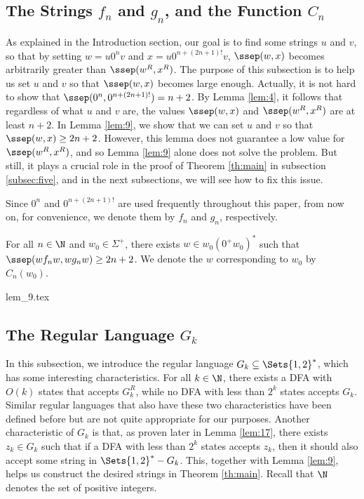 \documentclass[preprint, 12pt]{elsarticle}
\begin{document}
	
	\subsection{The Strings $f_n$ and $g_n$, and the Function $C_n$}	
	\label{subsec:two}
	As explained in the Introduction section, our goal is to find some strings $u$ and $v$, so that by setting $w = u 0^n v$ and $x = u 0^{n+(2n+1)!} v$, $\ssep(w,x)$ becomes arbitrarily greater than $\ssep(w^R, x^R)$. The purpose of this subsection is to help us set $u$ and $v$ so that $\ssep(w,x)$ becomes large enough. Actually, it is not hard to show that $\ssep(0^n, 0^{n+(2n+1)!}) = n + 2$. By Lemma \ref{lem:4}, it follows that regardless of what $u$ and $v$ are, the values $\ssep(w,x)$ and $\ssep(w^R,x^R)$ are at least $n+2$. In Lemma \ref{lem:9}, we show that we can set $u$ and $v$ so that $\ssep(w,x) \geq 2n+2$. However, this lemma does not guarantee a low value for $\ssep(w^R, x^R)$, and so Lemma \ref{lem:9} alone does not solve the problem. But still, it plays a crucial role in the proof of Theorem \ref{th:main} in subsection \ref{subsec:five}, and in the next subsections, we will see how to fix this issue.

\begin{definition}
	Since $0^n$ and $0^{n+(2n+1)!}$ are used frequently throughout this paper, from now on, for convenience, we denote them by $f_n$ and $g_n$, respectively.
\end{definition}

	
	\begin{lemma}
		\label{lem:9}
		For all $n \in \N$ and $w_0 \in \Sigma^+$, there exists $w \in w_0{\left( 0^+ w_0 \right)}^*$ such that $\ssep(wf_nw, wg_nw) \geq 2n + 2$. We denote the $w$ corresponding to $w_0$ by $C_n(w_0)$.
	\end{lemma}
	{lem_9.tex}
	
	
	\subsection{The Regular Language $G_k$}
	\label{subsec:three}
	In this subsection, we introduce the regular language $G_k \subseteq \Sets{1,2}^*$, which has some interesting characteristics. For all $k \in \N$,
	there exists a DFA with $O(k)$ states that accepts $G_k^R$, while no DFA with less than $2^k$ states accepts $G_k$. 
	Similar regular languages that also have these two characteristics
 	have been defined before \cite{reverseGaoKY12a, reverseJiraskova08, reverseSebej10} but are not quite appropriate for our purposes. Another characteristic of $G_k$ is that, as proven later in Lemma \ref{lem:17}, there exists $z_k \in G_k$ such that if a DFA with less than $2^k$ states accepts $z_k$, then it should also accept some string in $\Sets{1,2}^* - G_k$. This, together with Lemma \ref{lem:9}, helps us construct the desired strings in Theorem \ref{th:main}. Recall that $\N$ denotes the set of positive integers.
\end{document}
